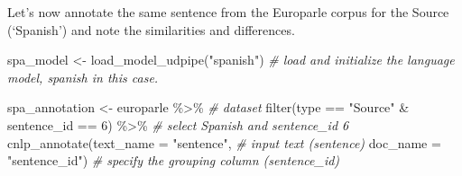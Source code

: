 \documentclass[
]{article}
\newenvironment{Shaded}{\begin{snugshade}}{\end{snugshade}}
\newcommand{\AttributeTok}[1]{\textcolor[rgb]{0.77,0.63,0.00}{#1}}
\newcommand{\CommentTok}[1]{\textcolor[rgb]{0.56,0.35,0.01}{\textit{#1}}}
\newcommand{\DecValTok}[1]{\textcolor[rgb]{0.00,0.00,0.81}{#1}}
\newcommand{\FunctionTok}[1]{\textcolor[rgb]{0.00,0.00,0.00}{#1}}
\newcommand{\NormalTok}[1]{#1}
\newcommand{\OtherTok}[1]{\textcolor[rgb]{0.56,0.35,0.01}{#1}}
\newcommand{\SpecialCharTok}[1]{\textcolor[rgb]{0.00,0.00,0.00}{#1}}
\newcommand{\StringTok}[1]{\textcolor[rgb]{0.31,0.60,0.02}{#1}}
\begin{document}
Let's now annotate the same sentence from the Europarle corpus for the Source (`Spanish') and note the similarities and differences.

\begin{Shaded}
\begin{Highlighting}[]
\NormalTok{spa\_model }\OtherTok{\textless{}{-}} \FunctionTok{load\_model\_udpipe}\NormalTok{(}\StringTok{"spanish"}\NormalTok{) }\CommentTok{\# load and initialize the language model, \textquotesingle{}spanish\textquotesingle{} in this case.}

\NormalTok{spa\_annotation }\OtherTok{\textless{}{-}} 
\NormalTok{  europarle }\SpecialCharTok{\%\textgreater{}\%} \CommentTok{\# dataset }
  \FunctionTok{filter}\NormalTok{(type }\SpecialCharTok{==} \StringTok{"Source"} \SpecialCharTok{\&}\NormalTok{ sentence\_id }\SpecialCharTok{==} \DecValTok{6}\NormalTok{) }\SpecialCharTok{\%\textgreater{}\%} \CommentTok{\# select Spanish and sentence\_id 6}
  \FunctionTok{cnlp\_annotate}\NormalTok{(}\AttributeTok{text\_name =} \StringTok{"sentence"}\NormalTok{, }\CommentTok{\# input text (sentence)}
                \AttributeTok{doc\_name =} \StringTok{"sentence\_id"}\NormalTok{) }\CommentTok{\# specify the grouping column (sentence\_id)}
\end{Highlighting}
\end{Shaded}
\end{document}

